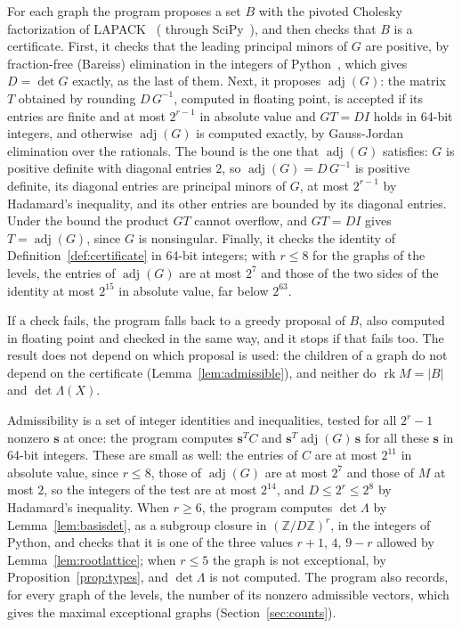 \documentclass[11pt]{article}
\newcommand\ints{{\mathbb Z}}
\newcommand\opk[1]{\mathop{\mathrm{#1}}\nolimits}
\newcommand\inv{^{-1}}
\newcommand\rk{\opk{rk}}
\theoremstyle{definition}
\DeclareRobustCommand{\ml}[1]{\ifmmode\text{\normalfont\small\ttfamily\detokenize{#1}}\else{\normalfont\small\nolinkurl{#1}}\fi}
\newcommand\Zs{{\mathbf s}}
\begin{document}
For each graph the program proposes a set $B$ with the pivoted Cholesky factorization of
LAPACK~\cite{LAPACK99} (\ml{dpstrf} through SciPy~\cite{VGO+20}), and then checks that $B$ is a
certificate. First, it checks that the leading principal minors of $G$ are positive, by
fraction-free (Bareiss) elimination in the integers of Python~\cite{Python}, which gives $D=\det G$
exactly, as the last of them. Next, it proposes $\operatorname{adj}(G)$: the matrix $T$ obtained
by rounding $D\,G\inv$, computed in floating point, is accepted if its entries are finite and at
most $2^{r-1}$ in absolute value and $GT=DI$ holds in 64-bit integers, and otherwise
$\operatorname{adj}(G)$ is computed exactly, by Gauss-Jordan elimination over the rationals. The
bound is the one that $\operatorname{adj}(G)$ satisfies: $G$ is positive definite with diagonal
entries $2$, so $\operatorname{adj}(G)=D\,G\inv$ is positive definite, its diagonal entries are
principal minors of $G$, at most $2^{r-1}$ by Hadamard's inequality, and its other entries are
bounded by its diagonal entries. Under the bound the product $GT$ cannot overflow, and $GT=DI$
gives $T=\operatorname{adj}(G)$, since $G$ is nonsingular. Finally, it checks the identity of
Definition~\ref{def:certificate} in 64-bit integers; with $r\le8$ for the graphs of the levels,
the entries of $\operatorname{adj}(G)$ are at most $2^7$ and those of the two sides of the
identity at most $2^{15}$ in absolute value, far below $2^{63}$.

If a check fails, the program falls back to a greedy proposal of $B$, also computed in floating
point and checked in the same way, and it stops if that fails too. The result does not depend on
which proposal is used: the children of a graph do not depend on the certificate
(Lemma~\ref{lem:admissible}), and neither do $\rk M=\lvert B\rvert$ and $\det\Lambda(X)$.

Admissibility is a set of integer identities and inequalities, tested for all $2^r-1$ nonzero
$\Zs$ at once: the program computes $\Zs^TC$ and $\Zs^T\operatorname{adj}(G)\,\Zs$ for all these
$\Zs$ in 64-bit integers. These are small as well: the entries of $C$ are at most $2^{11}$ in
absolute value, since $r\le8$, those of $\operatorname{adj}(G)$ are at most $2^7$ and those of
$M$ at most $2$, so the integers of the test are at most $2^{14}$, and $D\le2^r\le2^8$ by
Hadamard's inequality. When $r\ge6$, the program computes $\det\Lambda$ by
Lemma~\ref{lem:basisdet}, as a subgroup closure in $(\ints/D\ints)^r$, in the integers of
Python, and checks that it is one of the three values $r+1$, $4$, $9-r$ allowed by
Lemma~\ref{lem:rootlattice}; when $r\le5$ the graph is not exceptional, by
Proposition~\ref{prop:types}, and $\det\Lambda$ is not computed. The program also records, for
every graph of the levels, the number of its nonzero admissible vectors, which gives the maximal exceptional graphs
(Section~\ref{sec:counts}).
\end{document}
